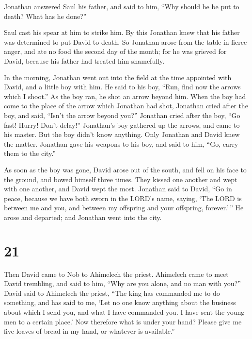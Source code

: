  Jonathan answered Saul his father, and said to him,
``Why should he be put to death? What has he done?''

 Saul cast his spear at him to strike him. By this
Jonathan knew that his father was determined to put David to death.
 So Jonathan arose from the table in fierce anger, and
ate no food the second day of the month; for he was grieved for David,
because his father had treated him shamefully.

 In the morning, Jonathan went out into the field at the
time appointed with David, and a little boy with him.  He
said to his boy, ``Run, find now the arrows which I shoot.'' As the boy
ran, he shot an arrow beyond him.  When the boy had come
to the place of the arrow which Jonathan had shot, Jonathan cried after
the boy, and said, ``Isn't the arrow beyond you?'' 
Jonathan cried after the boy, ``Go fast! Hurry! Don't delay!''
Jonathan's boy gathered up the arrows, and came to his master.
 But the boy didn't know anything. Only Jonathan and
David knew the matter.  Jonathan gave his weapons to his
boy, and said to him, ``Go, carry them to the city.''

 As soon as the boy was gone, David arose out of the
south, and fell on his face to the ground, and bowed himself three
times. They kissed one another and wept with one another, and David wept
the most.  Jonathan said to David, ``Go in peace, because
we have both sworn in the LORD's name, saying, `The LORD is between me
and you, and between my offspring and your offspring, forever.'\,'' He
arose and departed; and Jonathan went into the city.

\hypertarget{section-20}{%
\section{21}\label{section-20}}

 Then David came to Nob to Ahimelech the priest. Ahimelech
came to meet David trembling, and said to him, ``Why are you alone, and
no man with you?''  David said to Ahimelech the priest,
``The king has commanded me to do something, and has said to me, `Let no
one know anything about the business about which I send you, and what I
have commanded you. I have sent the young men to a certain place.'
 Now therefore what is under your hand? Please give me
five loaves of bread in my hand, or whatever is available.''


